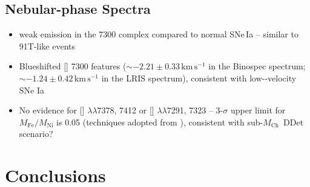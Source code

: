 \documentclass[twocolumn]{aastex631}
\newcommand{\Mch}{$M_\mathrm{Ch}$}
\begin{document}
\begin{CJK*}{UTF8}{gbsn}
\subsection{Nebular-phase Spectra}
\begin{itemize}
    \item weak emission in the 7300 complex compared to normal SNe\,Ia -- similar to 91T-like events
    \item Blueshifted [] 7300 features ($\sim$$-2.21\pm0.33\mathrm{\,km\,s^{-1}}$ in the Binospec spectrum; $\sim$$-1.24\pm0.42\mathrm{\,km\,s^{-1}}$ in the LRIS spectrum), consistent with low--velocity SNe Ia
    \item No evidence for [] $\lambda\lambda$7378, 7412 or [] $\lambda\lambda$7291, 7323 -- 3-$\sigma$ upper limit for $M_\mathrm{Fe}/M_\mathrm{Ni}$ is 0.05 (techniques adopted from \citet{Maguire_2018}), consistent with sub-\Mch\ DDet scenario?
\end{itemize}
\section{Conclusions} \label{sec:conclusion}




\end{CJK*}
\end{document}
